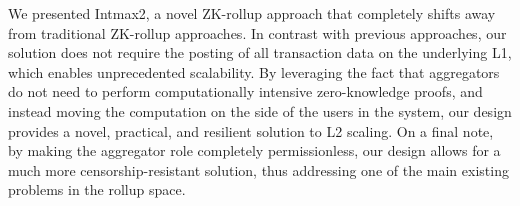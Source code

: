 We presented Intmax2, a novel ZK-rollup approach that completely
shifts away from traditional ZK-rollup approaches. In contrast with
previous approaches, our solution does not require the posting of all
transaction data on the underlying L1, which enables unprecedented
scalability. By leveraging the fact that aggregators do not need to
perform computationally intensive zero-knowledge proofs, and instead
moving the computation on the side of the users in the system, our
design provides a novel, practical, and resilient solution to L2
scaling. On a final note, by making the aggregator role completely
permissionless, our design allows for a much more
censorship-resistant solution, thus addressing one of the main
existing problems in the rollup space.
